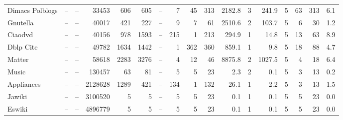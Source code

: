 \begin{table}[htbp]
\begin{adjustwidth}{-5cm}{-5cm}
\begin{tabular}{l *{16}{r}}
    Dimacs Polblogs & -- & -- & 33453 & 606 & 605 & -- & 7 & 45 & 313 & 2182.8 & 3 & 241.9 & 5 & 63 & 313 & 6.1 \\
    Gnutella & -- & -- & 40017 & 421 & 227 & -- & 9 & 7 & 61 & 2510.6 & 2 & 103.7 & 5 & 6 & 30 & 1.2 \\
    Ciaodvd & -- & -- & 40156 & 978 & 1593 & -- & 215 & 1 & 213 & 294.9 & 1 & 14.8 & 5 & 13 & 63 & 8.9 \\
    Dblp Cite & -- & -- & 49782 & 1634 & 1442 & -- & 1 & 362 & 360 & 859.1 & 1 & 9.8 & 5 & 18 & 88 & 4.7 \\
    Matter & -- & -- & 58618 & 2283 & 3276 & -- & 4 & 12 & 46 & 8875.8 & 2 & 1027.5 & 5 & 4 & 18 & 6.4 \\
    Music & -- & -- & 130457 & 63 & 81 & -- & 5 & 5 & 23 & 2.3 & 2 & 0.1 & 5 & 3 & 13 & 0.2 \\
    Appliances & -- & -- & 2128628 & 1289 & 421 & -- & 134 & 1 & 132 & 26.1 & 1 & 2.2 & 5 & 3 & 13 & 1.5 \\
    Jawiki & -- & -- & 3100520 & 5 & 5 & -- & 5 & 5 & 23 & 0.1 & 1 & 0.1 & 5 & 5 & 23 & 0.0 \\
    Eswiki & -- & -- & 4896779 & 5 & 5 & -- & 5 & 5 & 23 & 0.1 & 1 & 0.1 & 5 & 5 & 23 & 0.0 \\
    \bottomrule
  \end{tabular}
  \end{adjustwidth}
\end{table}
